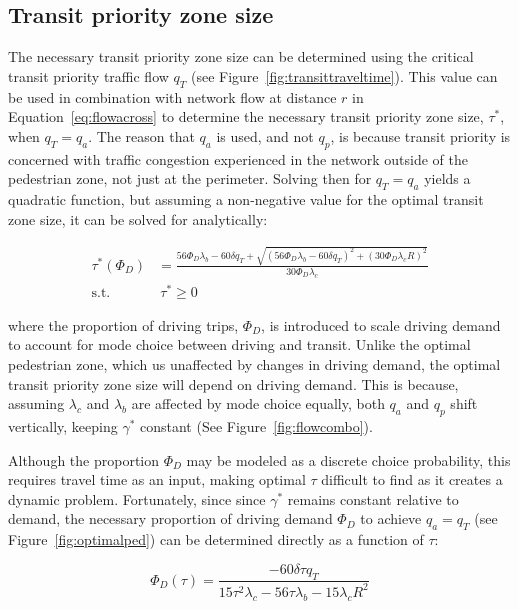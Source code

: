 \documentclass{elsarticle}\usepackage[]{graphicx}\usepackage[]{color}
\begin{document}
\subsection{Transit priority zone size}
The necessary transit priority zone size can be determined using the critical transit priority traffic flow $q_T$ (see Figure~\ref{fig:transittraveltime}). This value can be used in combination with network flow at distance $r$ in Equation~\eqref{eq:flowacross} to determine the necessary transit priority zone size, $\tau^*$, when $q_T = q_a$. The reason that $q_a$ is used, and not $q_p$, is because transit priority is concerned with traffic congestion experienced in the network outside of the pedestrian zone, not just at the perimeter. Solving then for $q_T = q_a$ yields a quadratic function, but assuming a non-negative value for the optimal transit zone size, it can be solved for analytically:

\begin{align}
    \tau^*(\Phi_D) & = \frac{56 \Phi_D \lambda_{b}-60\delta q_{T} +\sqrt{\left(56 \Phi_D \lambda_{b}-60\delta q_{T}\right)^{2} + (30 \Phi_D \lambda_{c} R)^2 }}{30 \Phi_D \lambda_{c}}\\
    \text{s.t.} & ~ \tau^* \geq 0 \nonumber
\end{align}

\noindent where the proportion of driving trips, $\Phi_D$, is introduced to scale driving demand to account for mode choice between driving and transit. Unlike the optimal pedestrian zone, which us unaffected by changes in driving demand, the optimal transit priority zone size will depend on driving demand. This is because, assuming $\lambda_c$ and $\lambda_b$ are affected by mode choice equally, both $q_a$ and $q_p$ shift vertically, keeping $\gamma^*$ constant (See Figure~\ref{fig:flowcombo}). 

Although the proportion $\Phi_D$ may be modeled as a discrete choice probability, this requires travel time as an input, making optimal $\tau$ difficult to find as it creates a dynamic problem. Fortunately, since since $\gamma^*$ remains constant relative to demand, the necessary proportion of driving demand $\Phi_D$ to achieve $q_a = q_T$ (see Figure~\ref{fig:optimalped}) can be determined directly as a function of $\tau$:

\begin{equation}
    \Phi_D(\tau) = \frac {-60\delta \tau q_{T}}{15\tau^{2}\lambda_{c} - 56 \tau \lambda_{b} - 15\lambda_{c}R^{2}}
\end{equation}
\end{document}
